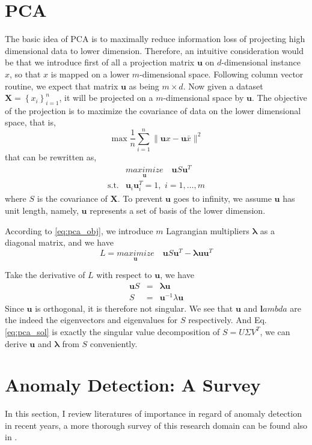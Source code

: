 \documentclass{article}
\newcommand{\vct}[1]{\ensuremath{\boldsymbol{#1}}} %
\begin{document}
\section{PCA}
The basic idea of PCA is to maximally reduce information loss of projecting high dimensional data to lower dimension. Therefore, an intuitive consideration would be that we introduce first of all a projection matrix $\vct u$ on $d$-dimensional instance $x$, so that $x$ is mapped on a lower $m$-dimensional space. Following column vector routine, we expect that matrix $\vct u$ as being $m \times d$. Now given a dataset $ \vct X = \left\{  x_i\right\}_{i=1}^{n}$, it will be projected on a $ m $-dimensional space by $\vct u$. The objective of the projection is to maximize the covariance of data on the lower dimensional space, that is,
\[
	\max \dfrac{1}{n}\sum_{i=1}^{n}\|\vct ux - \vct u\bar{x}\|^2
\]
that can be rewritten as,
\begin{eqnarray}
	& \underset{\vct u}{\textit{maximize}}\quad \vct u S \vct u^T \nonumber \\
	\text{s.t.} & \vct u_i\vct u_i^T = 1, \,\, i=1,\ldots,m
	\label{eq:pca_obj}
\end{eqnarray}
where $S$ is the covariance of $\vct X$. To prevent $\vct u$ goes to infinity, we assume $\vct u$ has unit length, namely, $\vct u$ represents a set of basis of the lower dimension.

According to \eqref{eq:pca_obj}, we introduce $m$ Lagrangian multipliers $\vct \lambda$ as a diagonal matrix, and we have
\[ L = \underset{\vct u}{\textit{maximize}}\quad \vct u S \vct u^T - \vct\lambda \vct u\vct u^T \]

Take the derivative of $L$ with respect to $\vct u$, we have
\begin{eqnarray}
	\vct uS & = & \vct\lambda\vct u \nonumber \\
	S & = & \vct u^{-1}\lambda\vct u
	\label{eq:pca_sol}
\end{eqnarray}
Since $\vct u$ is orthogonal, it is therefore not singular. We see that $\vct u$ and $\vct lambda$ are the indeed the eigenvectors and eigenvalues for $S$ respectively. And Eq.\eqref{eq:pca_sol} is exactly the singular value decomposition of $S=U\Sigma V^T$, we can derive $\vct u$ and $ \vct{\lambda} $ from $S$ conveniently.

\section{Anomaly Detection: A Survey}
In this section, I review literatures of importance in regard of anomaly detection in recent years, a more thorough survey of this research domain can be found also in \cite{Hodge2004, Chandola2009}. 




\end{document}
